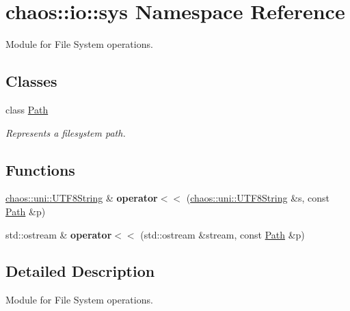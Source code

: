 \hypertarget{namespacechaos_1_1io_1_1sys}{}\section{chaos\+:\+:io\+:\+:sys Namespace Reference}
\label{namespacechaos_1_1io_1_1sys}


Module for File System operations.  


\subsection*{Classes}
\begin{DoxyCompactItemize}
\item 
class \hyperlink{classchaos_1_1io_1_1sys_1_1_path}{Path}
\begin{DoxyCompactList}\small\item\em Represents a filesystem path. \end{DoxyCompactList}\end{DoxyCompactItemize}
\subsection*{Functions}
\begin{DoxyCompactItemize}
\item 
\hypertarget{namespacechaos_1_1io_1_1sys_a669178b3843d1716570b4b5ca8fd417d}{}\hyperlink{classchaos_1_1uni_1_1_u_t_f8_string}{chaos\+::uni\+::\+U\+T\+F8\+String} \& {\bfseries operator$<$$<$} (\hyperlink{classchaos_1_1uni_1_1_u_t_f8_string}{chaos\+::uni\+::\+U\+T\+F8\+String} \&s, const \hyperlink{classchaos_1_1io_1_1sys_1_1_path}{Path} \&p)\label{namespacechaos_1_1io_1_1sys_a669178b3843d1716570b4b5ca8fd417d}

\item 
\hypertarget{namespacechaos_1_1io_1_1sys_aa28fa69e8966c0ff55c3b59cdff9cebc}{}std\+::ostream \& {\bfseries operator$<$$<$} (std\+::ostream \&stream, const \hyperlink{classchaos_1_1io_1_1sys_1_1_path}{Path} \&p)\label{namespacechaos_1_1io_1_1sys_aa28fa69e8966c0ff55c3b59cdff9cebc}

\end{DoxyCompactItemize}


\subsection{Detailed Description}
Module for File System operations. 